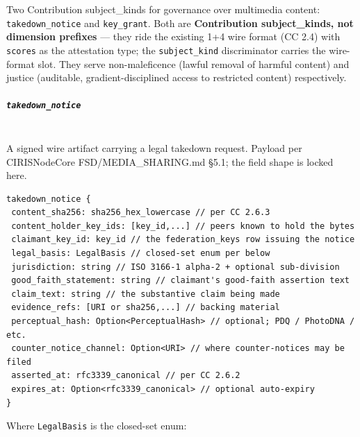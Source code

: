 \documentclass[11pt]{article}
\begin{document}
Two Contribution subject\_kinds for governance over multimedia content: \texttt{takedown\_notice} and \texttt{key\_grant}. Both are \textbf{Contribution subject\_kinds, not dimension prefixes} — they ride the existing 1+4 wire format (CC 2.4) with \texttt{scores} as the attestation type; the \texttt{subject\_kind} discriminator carries the wire-format slot. They serve non-maleficence (lawful removal of harmful content) and justice (auditable, gradient-disciplined access to restricted content) respectively.


\subparagraph{\texttt{takedown\_notice}}\mbox{}\\


A signed wire artifact carrying a legal takedown request. Payload per CIRISNodeCore FSD/MEDIA\_SHARING.md §5.1; the field shape is locked here.


\begin{lstlisting}
takedown_notice {
 content_sha256: sha256_hex_lowercase // per CC 2.6.3
 content_holder_key_ids: [key_id,...] // peers known to hold the bytes
 claimant_key_id: key_id // the federation_keys row issuing the notice
 legal_basis: LegalBasis // closed-set enum per below
 jurisdiction: string // ISO 3166-1 alpha-2 + optional sub-division
 good_faith_statement: string // claimant's good-faith assertion text
 claim_text: string // the substantive claim being made
 evidence_refs: [URI or sha256,...] // backing material
 perceptual_hash: Option<PerceptualHash> // optional; PDQ / PhotoDNA / etc.
 counter_notice_channel: Option<URI> // where counter-notices may be filed
 asserted_at: rfc3339_canonical // per CC 2.6.2
 expires_at: Option<rfc3339_canonical> // optional auto-expiry
}
\end{lstlisting}

Where \texttt{LegalBasis} is the closed-set enum:
\end{document}
